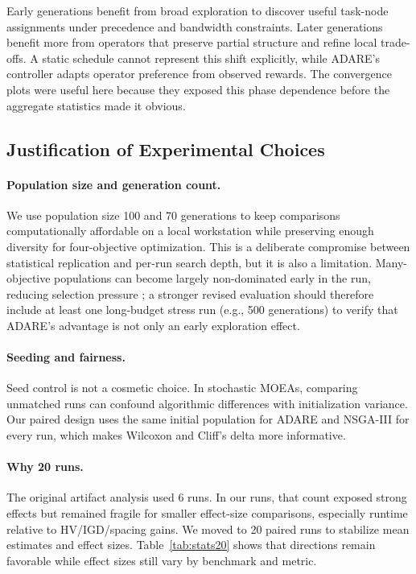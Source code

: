 \documentclass[runningheads]{llncs}
\begin{document}
Early generations benefit from broad exploration to discover useful task-node assignments under precedence and bandwidth constraints. Later generations benefit more from operators that preserve partial structure and refine local trade-offs. A static schedule cannot represent this shift explicitly, while ADARE's controller adapts operator preference from observed rewards. The convergence plots were useful here because they exposed this phase dependence before the aggregate statistics made it obvious.
\subsection{Justification of Experimental Choices}
\paragraph{Population size and generation count.}
We use population size 100 and 70 generations to keep comparisons computationally affordable on a local workstation while preserving enough diversity for four-objective optimization. This is a deliberate compromise between statistical replication and per-run search depth, but it is also a limitation. Many-objective populations can become largely non-dominated early in the run, reducing selection pressure \cite{purshouse2007many}; a stronger revised evaluation should therefore include at least one long-budget stress run (e.g., 500 generations) to verify that ADARE's advantage is not only an early exploration effect.

\paragraph{Seeding and fairness.}
Seed control is not a cosmetic choice. In stochastic MOEAs, comparing unmatched runs can confound algorithmic differences with initialization variance. Our paired design uses the same initial population for ADARE and NSGA-III for every run, which makes Wilcoxon and Cliff's delta more informative.

\paragraph{Why 20 runs.}
The original artifact analysis used 6 runs. In our runs, that count exposed strong effects but remained fragile for smaller effect-size comparisons, especially runtime relative to HV/IGD/spacing gains. We moved to 20 paired runs to stabilize mean estimates and effect sizes. Table~\ref{tab:stats20} shows that directions remain favorable while effect sizes still vary by benchmark and metric.
\end{document}
